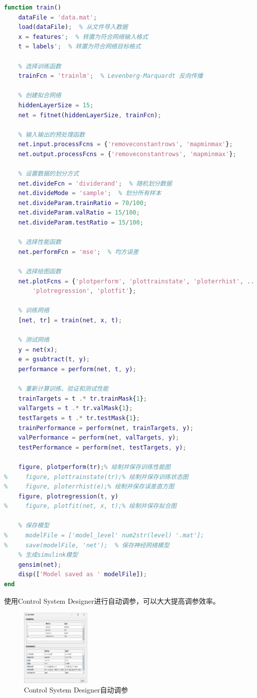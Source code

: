 \documentclass[12pt,a4paper,UTF8]{article}
\begin{document}
\begin{lstlisting}[language=Matlab,caption=使用脚本替代ui操作，并且函数化]
function train()
    dataFile = 'data.mat';
    load(dataFile);  % 从文件导入数据
    x = features';  % 转置为符合网络输入格式
    t = labels';  % 转置为符合网络目标格式

    % 选择训练函数
    trainFcn = 'trainlm';  % Levenberg-Marquardt 反向传播

    % 创建拟合网络
    hiddenLayerSize = 15;
    net = fitnet(hiddenLayerSize, trainFcn);

    % 输入输出的预处理函数
    net.input.processFcns = {'removeconstantrows', 'mapminmax'};
    net.output.processFcns = {'removeconstantrows', 'mapminmax'};

    % 设置数据的划分方式
    net.divideFcn = 'dividerand';  % 随机划分数据
    net.divideMode = 'sample';  % 划分所有样本
    net.divideParam.trainRatio = 70/100;
    net.divideParam.valRatio = 15/100;
    net.divideParam.testRatio = 15/100;

    % 选择性能函数
    net.performFcn = 'mse';  % 均方误差

    % 选择绘图函数
    net.plotFcns = {'plotperform', 'plottrainstate', 'ploterrhist', ...
        'plotregression', 'plotfit'};

    % 训练网络
    [net, tr] = train(net, x, t);

    % 测试网络
    y = net(x);
    e = gsubtract(t, y);
    performance = perform(net, t, y);

    % 重新计算训练、验证和测试性能
    trainTargets = t .* tr.trainMask{1};
    valTargets = t .* tr.valMask{1};
    testTargets = t .* tr.testMask{1};
    trainPerformance = perform(net, trainTargets, y);
    valPerformance = perform(net, valTargets, y);
    testPerformance = perform(net, testTargets, y);

    figure, plotperform(tr);% 绘制并保存训练性能图
%     figure, plottrainstate(tr);% 绘制并保存训练状态图
%     figure, ploterrhist(e);% 绘制并保存误差直方图
    figure, plotregression(t, y)
%     figure, plotfit(net, x, t);% 绘制并保存拟合图

    % 保存模型
%     modelFile = ['model_level' num2str(level) '.mat'];
%     save(modelFile, 'net');  % 保存神经网络模型
    % 生成simulink模型
    gensim(net);
    disp(['Model saved as ' modelFile]);
end
\end{lstlisting}

使用Control System Designer进行自动调参，可以大大提高调参效率。

\begin{figure}[htbp] \centering \includegraphics[width=0.3\textwidth]{2024-12-30-11-56-41.png} \caption{Control System Designer自动调参}\end{figure}
\end{document}
